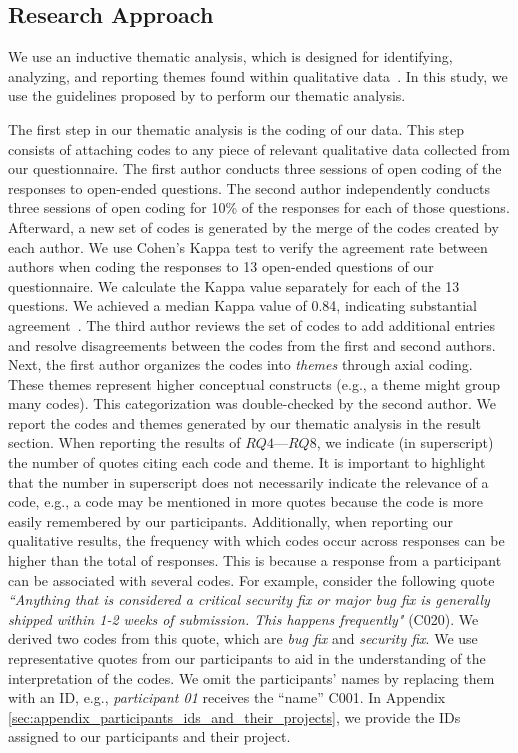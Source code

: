 \subsection{Research Approach}
\label{sec:research_approach}

We use an inductive thematic analysis, which is designed for identifying, analyzing, and reporting themes found within qualitative data~\citep{braun2006using}. In this study, we use the guidelines proposed by \cite{nowell2017thematic} to perform our thematic analysis.

The first step in our thematic analysis is the coding of our data. This step consists of attaching codes to any piece of relevant qualitative data collected from our questionnaire. The first author conducts three sessions of open coding of the responses to open-ended questions. The second author independently conducts three sessions of open coding for 10\% of the responses for each of those questions. Afterward, a new set of codes is generated by the merge of the codes created by each author. 
We use Cohen's Kappa test to verify the agreement rate between authors when coding the responses to 13 open-ended questions of our questionnaire.
We calculate the Kappa value separately for each of the 13 questions. We achieved a median Kappa value of 0.84, indicating substantial agreement~\citep{landis1977kappa}. 
The third author reviews the set of codes to add additional entries and resolve disagreements between the codes from the first and second authors. 
Next, the first author organizes the codes into {\em themes} through axial coding. These themes represent higher conceptual constructs (e.g., a theme might group many codes). 
This categorization was double-checked by the second author. 
We report the codes and themes generated by our thematic analysis in the result section. When reporting the results of $RQ4$---$RQ8$, we indicate (in superscript) the number of quotes citing each code and theme. It is important to highlight that the number in superscript does not necessarily indicate the relevance of a code, e.g., a code may be mentioned in more quotes because the code is more easily remembered by our participants. 
Additionally, when reporting our qualitative results, the frequency with which codes occur across responses can be higher than the total of responses. This is because a response from a participant can be associated with several codes. For example, consider the following quote \textit{``Anything that is considered a critical security fix or major bug fix is generally shipped within 1-2 weeks of submission. This happens frequently"} (C020). We derived two codes from this quote, which are \textit{bug fix} and \textit{security fix}.
We use representative quotes from our participants to aid in the understanding of the interpretation of the codes. 
We omit the participants' names by replacing them with an ID, e.g., {\em participant 01} receives the ``name'' C001. In Appendix \ref{sec:appendix_participants_ids_and_their_projects}, we provide the IDs assigned to our participants and their project. 

